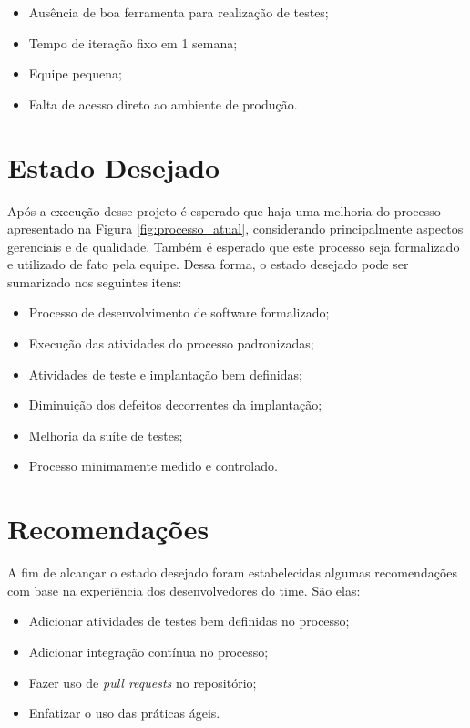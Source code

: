 \begin{itemize}
  \item Ausência de boa ferramenta para realização de testes;
  \item Tempo de iteração fixo em 1 semana;
  \item Equipe pequena;
  \item Falta de acesso direto ao ambiente de produção.
\end{itemize}

\section{Estado Desejado}

Após a execução desse projeto é esperado que haja uma melhoria do processo apresentado na Figura \ref{fig:processo_atual}, 
considerando principalmente aspectos gerenciais e de qualidade. Também é esperado que este processo seja formalizado e utilizado
de fato pela equipe. Dessa forma, o estado desejado pode ser sumarizado nos seguintes itens:

\begin{itemize}
	\item Processo de desenvolvimento de software formalizado;
	\item Execução das atividades do processo padronizadas;
	\item Atividades de teste e implantação bem definidas;
	\item Diminuição dos defeitos decorrentes da implantação;
	\item Melhoria da suíte de testes;
	\item Processo minimamente medido e controlado.

\end{itemize}

	
\section{Recomendações}

A fim de alcançar o estado desejado foram estabelecidas algumas recomendações com base na experiência dos desenvolvedores do time.
São elas: 

\begin{itemize}
    \item Adicionar atividades de testes bem definidas no processo;
    \item Adicionar integração contínua no processo;
    \item Fazer uso de \textit{pull requests} no repositório;
    \item Enfatizar o uso das práticas ágeis.
\end{itemize}
